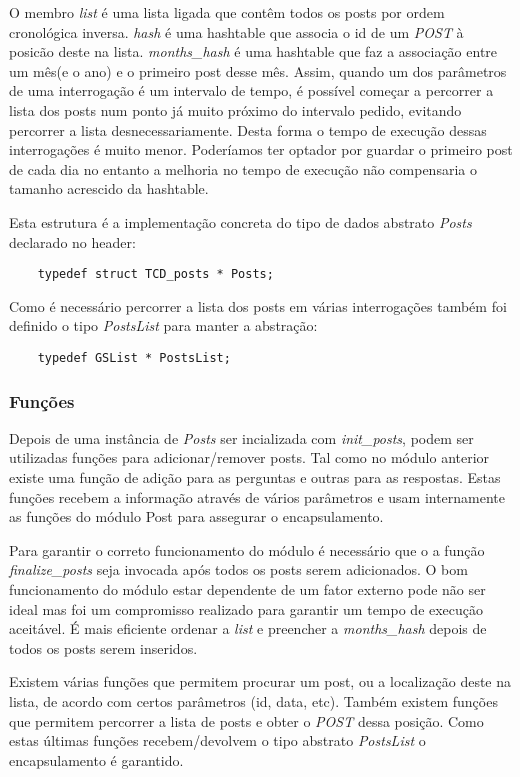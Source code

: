 \documentclass[10pt]{article}
\begin{document}
	O membro \emph{list} é uma lista ligada que contêm todos os posts por ordem cronológica inversa. \emph{hash} é uma hashtable que associa o id de um \emph{POST} à posicão deste na lista. \emph{months\_hash} é uma hashtable que faz a associação entre um mês(e o ano) e o primeiro post desse mês. Assim, quando um dos parâmetros de uma interrogação é um intervalo de tempo, é possível começar a percorrer a lista dos posts num ponto já muito próximo do intervalo pedido, evitando percorrer a lista desnecessariamente. Desta forma o tempo de execução dessas interrogações é muito menor. Poderíamos ter optador por guardar o primeiro post de cada dia no entanto a melhoria no tempo de execução não compensaria o tamanho acrescido da hashtable. 

	Esta estrutura é a implementação concreta do tipo de dados abstrato \emph{Posts} declarado no header:
	\begin{lstlisting} 
	typedef struct TCD_posts * Posts;
	\end{lstlisting}

	Como é necessário percorrer a lista dos posts em várias interrogações também foi definido o tipo \emph{PostsList} para manter a abstração:
	\begin{lstlisting} 
	typedef GSList * PostsList;
	\end{lstlisting}

\subsubsection{Funções}	
	
	Depois de uma instância de \emph{Posts} ser incializada com \emph{init\_posts}, podem ser utilizadas funções para adicionar/remover posts. Tal como no módulo anterior existe uma função de adição para as perguntas e outras para as respostas. Estas funções recebem a informação através de vários parâmetros e usam internamente as funções do módulo Post para assegurar o encapsulamento.

	Para garantir o correto funcionamento do módulo é necessário que o a função \emph{finalize\_posts} seja invocada após todos os posts serem adicionados. O bom funcionamento do módulo estar dependente de um fator externo pode não ser ideal mas foi um compromisso realizado para garantir um tempo de execução aceitável. É mais eficiente ordenar a \emph{list} e preencher a \emph{months\_hash} depois de todos os posts serem inseridos.

	Existem várias funções que permitem procurar um post, ou a localização deste na lista, de acordo com certos parâmetros (id, data, etc). Também existem funções que permitem percorrer a lista de posts e obter o \emph{POST} dessa posição. Como estas últimas funções recebem/devolvem o tipo abstrato \emph{PostsList} o encapsulamento é garantido.
\end{document}
